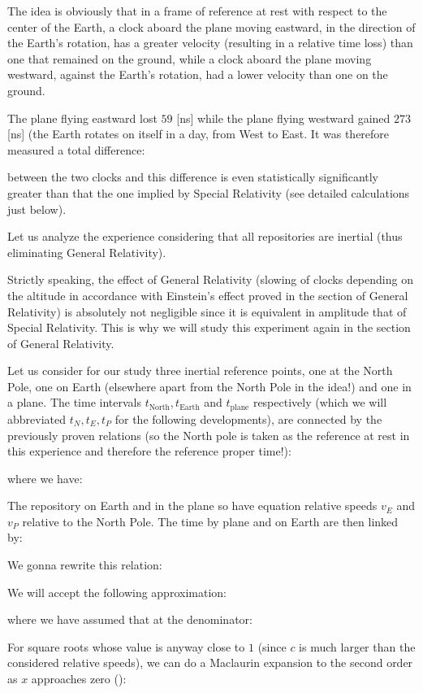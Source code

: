 	The idea is obviously that in a frame of reference at rest with respect to the center of the Earth, a clock aboard the plane moving eastward, in the direction of the Earth's rotation, has a greater velocity (resulting in a relative time loss) than one that remained on the ground, while a clock aboard the plane moving westward, against the Earth's rotation, had a lower velocity than one on the ground.
	
	The plane flying eastward lost $59$ [ns] while the plane flying westward gained $273$ [ns] (the Earth rotates on itself in a day, from West to East. It was therefore measured a total difference:
	
	between the two clocks and this difference is even statistically significantly greater than that the one implied by Special Relativity (see detailed calculations just below).

	Let us analyze the experience considering that all repositories are inertial (thus eliminating General Relativity).
	\begin{tcolorbox}[title=Remark,colframe=black,arc=10pt]
	Strictly speaking, the effect of General Relativity (slowing of clocks depending on the altitude in accordance with Einstein's effect proved in the section of General Relativity) is absolutely not negligible since it is equivalent in amplitude that of Special Relativity. This is why we will study this experiment again in the section of General Relativity.
	\end{tcolorbox}
	Let us consider for our study  three inertial reference points, one at the North Pole, one on Earth (elsewhere apart from the North Pole in the idea!) and one in a plane. The time intervals $t_{\text{North}},t_{\text{Earth}}$ and $t_{\text{plane}}$ respectively (which we will abbreviated $t_N,t_E,t_P$ for the following developments), are connected by the previously proven relations (so the North pole is taken as the reference at rest in this experience and therefore the reference proper time!):
	
	where we have:
	
	The repository on Earth and in the plane so have equation relative speeds $v_E$ and $v_P$ relative to the North Pole. The time by plane and on Earth are then linked by:
	
	We gonna rewrite this relation:
	
	We will accept the following approximation:
	
	where we have assumed that at the denominator:
	
	For square roots whose value is anyway close to $1$ (since $c$ is much larger than the considered relative speeds), we can do a Maclaurin expansion to the second order as $x$ approaches zero ():
	
